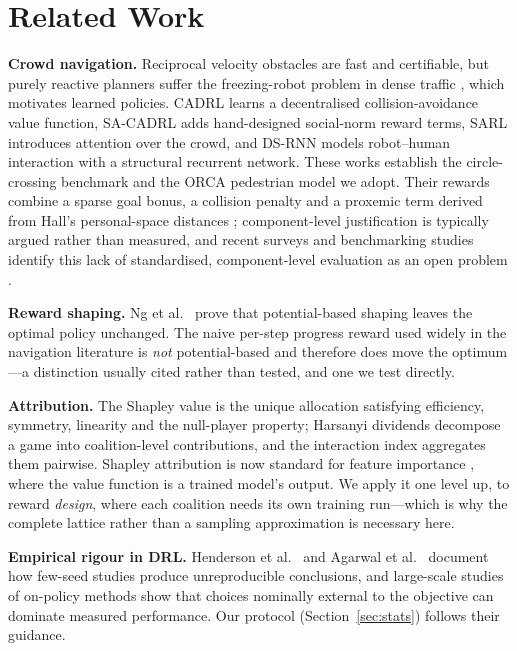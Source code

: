 \documentclass[conference]{IEEEtran}
\begin{document}
\section{Related Work}
\textbf{Crowd navigation.} Reciprocal velocity obstacles
\cite{vandenberg2011reciprocal} are fast and certifiable, but purely reactive
planners suffer the freezing-robot problem in dense traffic
\cite{trautman2010unfreezing}, which motivates learned policies. CADRL
\cite{chen2017decentralized} learns a decentralised collision-avoidance value
function, SA-CADRL \cite{chen2017socially} adds hand-designed social-norm reward
terms, SARL \cite{chen2019crowdrobot} introduces attention over the crowd, and
DS-RNN \cite{liu2021decentralized} models robot--human interaction with a
structural recurrent network. These works establish the circle-crossing benchmark
and the ORCA pedestrian model we adopt. Their rewards combine a sparse
goal bonus, a collision penalty and a proxemic term derived from Hall's
personal-space distances \cite{hall1966hidden}; component-level justification is
typically argued rather than measured, and recent surveys and benchmarking
studies identify this lack of standardised, component-level evaluation as an open
problem \cite{mavrogiannis2023core,alyassi2025social}.

\textbf{Reward shaping.} Ng et al.\ \cite{ng1999policy} prove that
potential-based shaping leaves the optimal policy unchanged. The naive per-step
progress reward used widely in the navigation literature is \emph{not}
potential-based and therefore does move the optimum---a distinction usually cited
rather than tested, and one we test directly.

\textbf{Attribution.} The Shapley value \cite{shapley1953value} is the unique
allocation satisfying efficiency, symmetry, linearity and the null-player
property; Harsanyi dividends \cite{harsanyi1963simplified} decompose a game into
coalition-level contributions, and the interaction index
\cite{grabisch1999axiomatic} aggregates them pairwise. Shapley attribution is now
standard for feature importance \cite{lundberg2017unified}, where the value
function is a trained model's output. We apply it one level up, to reward
\emph{design}, where each coalition needs its own training run---which is why the
complete lattice rather than a sampling approximation is necessary here.

\textbf{Empirical rigour in DRL.} Henderson et al.\ \cite{henderson2018deep} and
Agarwal et al.\ \cite{agarwal2021precipice} document how few-seed studies produce
unreproducible conclusions, and large-scale studies of on-policy methods
\cite{andrychowicz2021what} show that choices nominally external to the objective
can dominate measured performance. Our protocol
(Section~\ref{sec:stats}) follows their guidance.
\end{document}

